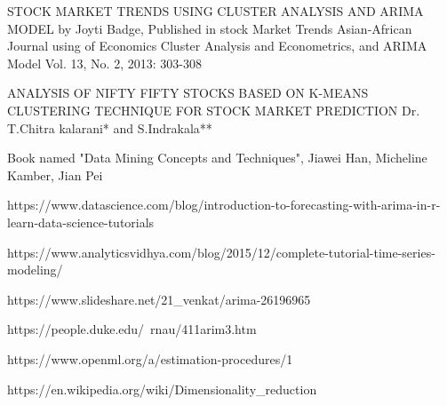 \documentclass{article}
\begin{document}
\begin{thebibliography}{widestlabel}
	
	STOCK MARKET TRENDS USING CLUSTER ANALYSIS AND ARIMA MODEL by Joyti Badge, Published in stock Market Trends
	Asian-African Journal using of Economics Cluster Analysis
	and Econometrics, and ARIMA Model Vol. 13, No. 2, 2013: 303-308
	
	ANALYSIS OF NIFTY FIFTY STOCKS BASED ON K-MEANS CLUSTERING TECHNIQUE FOR STOCK MARKET PREDICTION Dr. T.Chitra kalarani* and S.Indrakala**
	
	Book named "Data Mining Concepts and Techniques", Jiawei Han, Micheline Kamber, Jian Pei
	
	https://www.datascience.com/blog/introduction-to-forecasting-with-arima-in-r-learn-data-science-tutorials
	
	https://www.analyticsvidhya.com/blog/2015/12/complete-tutorial-time-series-modeling/
	
	https://www.slideshare.net/21\_venkat/arima-26196965
	
	https://people.duke.edu/~rnau/411arim3.htm
	
	https://www.openml.org/a/estimation-procedures/1
	
	https://en.wikipedia.org/wiki/Dimensionality\_reduction
	
\end{thebibliography}
\end{document}
